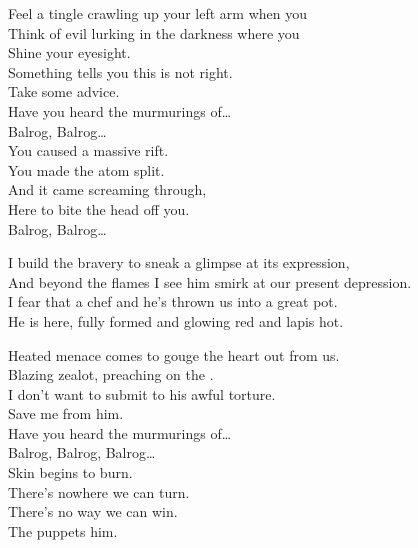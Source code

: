 
Feel a tingle crawling up your left arm when you \\
Think of evil lurking in the darkness where you \\
Shine your eyesight. \\
Something tells you this is not right. \\
Take some advice. \\
Have you heard the murmurings of… \\

Balrog, Balrog… \\

You caused a massive rift. \\
You made the atom split. \\
And it came screaming through, \\
Here to bite the head off you. \\

Balrog, Balrog… \\


I build the bravery to sneak a glimpse at its expression, \\
And beyond the flames I see him smirk at our present depression. \\

I fear that  a chef and he's thrown us into a great pot. \\
He is here, fully formed and glowing red and lapis hot. \\


Heated menace comes to gouge the heart out from us. \\
Blazing zealot, preaching on the . \\
I don't want to submit to his awful torture. \\
Save me from him. \\
Have you heard the murmurings of… \\

Balrog, Balrog, Balrog… \\

Skin begins to burn. \\
There's nowhere we can turn. \\
There's no way we can win. \\
The  puppets him. \\

